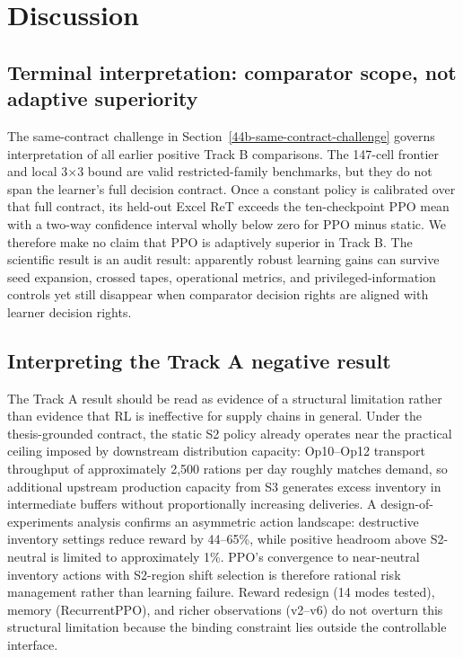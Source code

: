 \hypertarget{5-discussion}{%
\section{Discussion}\label{5-discussion}}

\hypertarget{50-terminal-interpretation}{%
\subsection{Terminal interpretation: comparator scope, not adaptive superiority}\label{50-terminal-interpretation}}

The same-contract challenge in Section~\ref{44b-same-contract-challenge}
governs interpretation of all earlier positive Track B comparisons. The
147-cell frontier and local 3$\times$3 bound are valid restricted-family
benchmarks, but they do not span the learner's full decision contract. Once a
constant policy is calibrated over that full contract, its held-out Excel ReT
exceeds the ten-checkpoint PPO mean with a two-way confidence interval wholly
below zero for PPO minus static. We therefore make no claim that PPO is
adaptively superior in Track B. The scientific result is an audit result:
apparently robust learning gains can survive seed expansion, crossed tapes,
operational metrics, and privileged-information controls yet still disappear
when comparator decision rights are aligned with learner decision rights.

\hypertarget{51-interpreting-track-a}{%
\subsection{Interpreting the Track A negative result}\label{51-interpreting-track-a}}

The Track A result should be read as evidence of a structural limitation
rather than evidence that RL is ineffective for supply chains in general.
Under the thesis-grounded contract, the static S2 policy already operates
near the practical ceiling imposed by downstream distribution capacity:
Op10--Op12 transport throughput of approximately 2,500 rations per day
roughly matches demand, so additional upstream production capacity from S3
generates excess inventory in intermediate buffers without proportionally
increasing deliveries. A design-of-experiments analysis confirms an
asymmetric action landscape: destructive inventory settings reduce reward by
44--65\%, while positive headroom above S2-neutral is limited to
approximately 1\%. PPO's convergence to near-neutral inventory actions with
S2-region shift selection is therefore rational risk management rather than
learning failure. Reward redesign (14 modes tested), memory (RecurrentPPO),
and richer observations (v2--v6) do not overturn this structural limitation
because the binding constraint lies outside the controllable interface.

